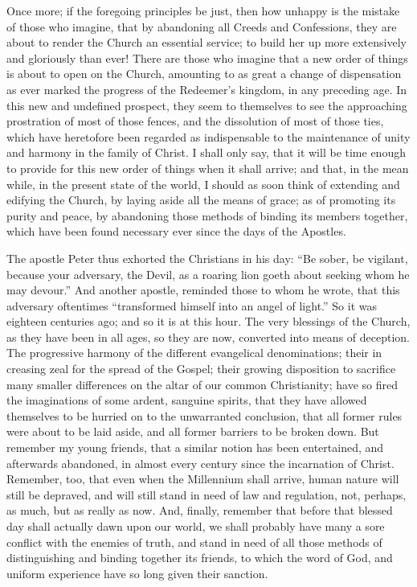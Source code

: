 \documentclass[
]{book}
\begin{document}
Once more; if the foregoing principles be just, then how unhappy is the mistake of those who imagine, that by abandoning all Creeds and Confessions, they are about to render the Church an essential service; to build her up more extensively and gloriously than ever! There are those who imagine that a new order of things is about to open on the Church, amounting to as great a change of dispensation as ever marked the progress of the Redeemer's kingdom, in any preceding age. In this new and undefined prospect, they seem to themselves to see the approaching prostration of most of those fences, and the dissolution of most of those ties, which have heretofore been regarded as indispensable to the maintenance of unity and harmony in the family of Christ. I shall only say, that it will be time enough to provide for this new order of things when it shall arrive; and that, in the mean while, in the present state of the world, I should as soon think of extending and edifying the Church, by laying aside all the means of grace; as of promoting its purity and peace, by abandoning those methods of binding its members together, which have been found necessary ever since the days of the Apostles.

The apostle Peter thus exhorted the Christians in his day: ``Be sober, be vigilant, because your adversary, the Devil, as a roaring lion goeth about seeking whom he may devour.'' And another apostle, reminded those to whom he wrote, that this adversary oftentimes ``transformed himself into an angel of light.'' So it was eighteen centuries ago; and so it is at this hour. The very blessings of the Church, as they have been in all ages, so they are now, converted into means of deception. The progressive harmony of the different evangelical denominations; their in creasing zeal for the spread of the Gospel; their growing disposition to sacrifice many smaller differences on the altar of our common Christianity; have so fired the imaginations of some ardent, sanguine spirits, that they have allowed themselves to be hurried on to the unwarranted conclusion, that all former rules were about to be laid aside, and all former barriers to be broken down. But remember my young friends, that a similar notion has been entertained, and afterwards abandoned, in almost every century since the incarnation of Christ. Remember, too, that even when the Millennium shall arrive, human nature will still be depraved, and will still stand in need of law and regulation, not, perhaps, as much, but as really as now. And, finally, remember that before that blessed day shall actually dawn upon our world, we shall probably have many a sore conflict with the enemies of truth, and stand in need of all those methods of distinguishing and binding together its friends, to which the word of God, and uniform experience have so long given their sanction.
\end{document}
